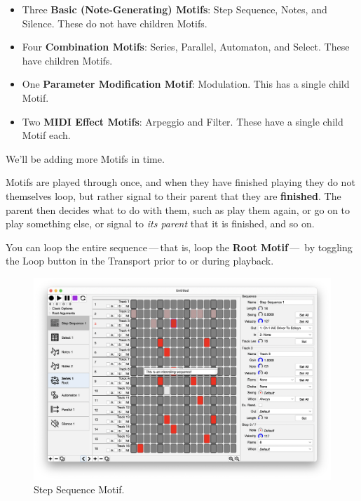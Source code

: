 \documentclass[twoside,10pt]{article}
\begin{document}
\begin{itemize}
\item Three {\bf Basic (Note-Generating) Motifs}: Step Sequence, Notes, and Silence.  These do not have children Motifs.
\item Four {\bf Combination Motifs}: Series, Parallel, Automaton, and Select.  These have children Motifs.
\item One {\bf Parameter Modification Motif}: Modulation.  This has a single child Motif.
\item Two {\bf MIDI Effect Motifs}: Arpeggio and Filter.  These have a single child Motif each.
\end{itemize}

We'll be adding more Motifs in time.

\vspace{1em}

Motifs are played through once, and when they have finished playing they do not themselves loop, but rather signal to their parent that they are {\bf finished}.  The parent then decides what to do with them, such as play them again, or go on to play something else, or signal to {\it its parent} that it is finished, and so on.

You can loop the entire sequence\,---\,that is, loop the {\bf Root Motif}\,---\, by toggling the Loop button in the Transport prior to or during playback.

\clearpage

\begin{figure}[t]
\centering
\includegraphics[width=6.5in]{StepSequence}
\vspace{-2em}
\caption{Step Sequence Motif.}
\label{stepsequence}
\end{figure}
\end{document}
